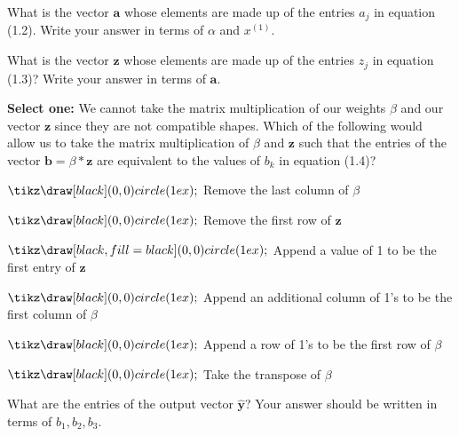 \documentclass[11pt]{exam}
\numberwithin{equation}{section} %
\numberwithin{figure}{section} %
\numberwithin{table}{section} %
\newcommand{\blackcircle}{\tikz\draw[black,fill=black] (0,0) circle (1ex);}
\renewcommand{\circle}{\tikz\draw[black] (0,0) circle (1ex);}
\newcommand{\av}{\mathbf{a}}
\newcommand{\bv}{\mathbf{b}}
\newcommand{\yv}{\mathbf{y}}
\newcommand{\zv}{\mathbf{z}}
\begin{document}
\begin{enumerate}
\begin{questions}
	        
	        
	        
	        \question[1] What is the vector $\av$ whose elements are made up of the entries $a_j$ in equation (1.2). Write your answer in terms of $\alpha$ and $x^{(1)}$.
	        
	        \begin{tcolorbox}[fit,height=1cm, width=10cm, blank, borderline={1pt}{-2pt}]
			[$\alpha _1 \cdot x^{(1)}_1$, $\alpha _2 \cdot x^{(1)}_2$, $\alpha _3 \cdot x^{(1)}_3$, $\alpha _4 \cdot x^{(1)}_4$]
	        \end{tcolorbox}
	        
	        
	        
	        
	        \question[1] What is the vector $\zv$ whose elements are made up of the entries $z_j$ in equation (1.3)? Write your answer in terms of $\av$.
	        
	        \begin{tcolorbox}[fit,height=1cm, width=6cm, blank, borderline={1pt}{-2pt}]
			[$\sigma(a_1)$, $\sigma(a_2)$, $\sigma(a_3)$, $\sigma(a_4)$]
	        \end{tcolorbox}
	        
	        \clearpage	        

	        \question[1] \textbf{Select one:} We cannot take the matrix multiplication of our weights $\beta$ and our vector $\zv$ since they are not compatible shapes. Which of the following would allow us to take the matrix multiplication of $\beta$ and $\zv$ such that the entries of the vector $\bv = \beta*\zv$ are equivalent to the values of $b_k$ in equation (1.4)? 
	        
	        
	        
	        \question[1] What are the entries of the output vector $\hat{\yv}$? Your answer should be written in terms of $b_1,b_2,b_3$.
	        

\end{questions}
\end{enumerate}
\end{document}
